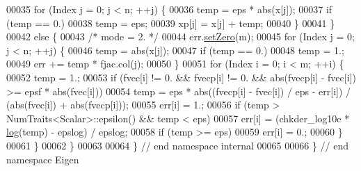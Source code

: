 \begin{DoxyCode}
00035         \textcolor{keywordflow}{for} (Index j = 0; j < n; ++j) \{
00036             temp = eps * abs(x[j]);
00037             \textcolor{keywordflow}{if} (temp == 0.)
00038                 temp = eps;
00039             xp[j] = x[j] + temp;
00040         \}
00041     \}
00042     \textcolor{keywordflow}{else} \{
00043         \textcolor{comment}{/* mode = 2. */}
00044         err.\hyperlink{class_eigen_1_1_plain_object_base_ac21ad5f989f320e46958b75ac8d9a1da}{setZero}(m); 
00045         \textcolor{keywordflow}{for} (Index j = 0; j < n; ++j) \{
00046             temp = abs(x[j]);
00047             \textcolor{keywordflow}{if} (temp == 0.)
00048                 temp = 1.;
00049             err += temp * fjac.col(j);
00050         \}
00051         \textcolor{keywordflow}{for} (Index i = 0; i < m; ++i) \{
00052             temp = 1.;
00053             \textcolor{keywordflow}{if} (fvec[i] != 0. && fvecp[i] != 0. && abs(fvecp[i] - fvec[i]) >= epsf * abs(fvec[i]))
00054                 temp = eps * abs((fvecp[i] - fvec[i]) / eps - err[i]) / (abs(fvec[i]) + abs(fvecp[i]));
00055             err[i] = 1.;
00056             \textcolor{keywordflow}{if} (temp > NumTraits<Scalar>::epsilon() && temp < eps)
00057                 err[i] = (chkder\_log10e * \hyperlink{structlog}{log}(temp) - epslog) / epslog;
00058             \textcolor{keywordflow}{if} (temp >= eps)
00059                 err[i] = 0.;
00060         \}
00061     \}
00062 \}
00063 
00064 \} \textcolor{comment}{// end namespace internal}
00065 
00066 \} \textcolor{comment}{// end namespace Eigen}
\end{DoxyCode}
